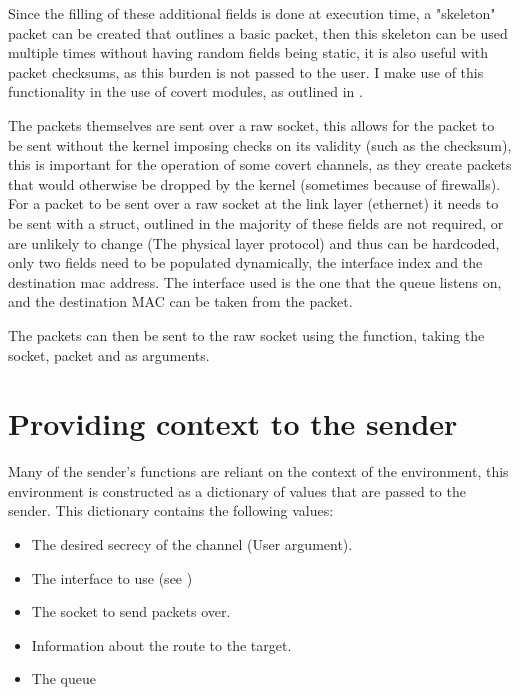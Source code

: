 Since the filling of these additional fields is done at execution time, a "skeleton" packet can be created that outlines a basic packet, then this skeleton can be used multiple times without having random fields being static, it is also useful with packet checksums, as this burden is not passed to the user. I make use of this functionality in the use of covert modules, as outlined in .

The packets themselves are sent over a raw socket, this allows for the packet to be sent without the kernel imposing checks on its validity (such as the checksum), this is important for the operation of some covert channels, as they create packets that would otherwise be dropped by the kernel (sometimes because of firewalls). For a packet to be sent over a raw socket at the link layer (ethernet) it needs to be sent with a  struct, outlined in \cite{packet_7} the majority of these fields are not required, or are unlikely to change (The physical layer protocol) and thus can be hardcoded, only two fields need to be populated dynamically, the interface index and the destination mac address. The interface used is the one that the queue listens on, and the destination MAC can be taken from the packet.

The packets can then be sent to the raw socket using the  function, taking the socket, packet and  as arguments.

\section{Providing context to the sender}
\label{sec:context}

Many of the sender's functions are reliant on the context of the environment, this environment is constructed as a dictionary of values that are passed to the sender. This dictionary contains the following values:

\begin{itemize}
    \item The desired secrecy of the channel (User argument).
    \item The interface to use (see )
    \item The socket to send packets over.
    \item Information about the route to the target.
    \item The queue
\end{itemize}


